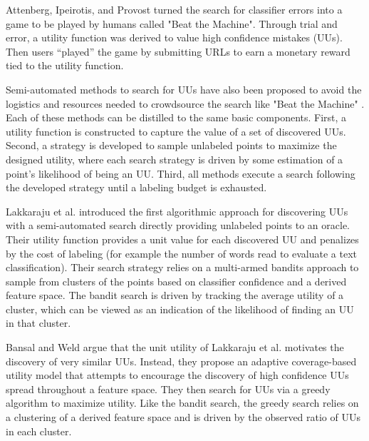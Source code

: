 \documentclass[10pt, conference]{IEEEtran}
\begin{document}
Attenberg, Ipeirotis, and Provost \cite{Attenberg2015} turned the search for classifier errors into a game to be played by humans called "Beat the Machine". 
 Through trial and error, a utility function was derived to value high confidence mistakes (UUs). Then users ``played'' the game by submitting URLs to earn a monetary reward tied to the utility function. 

Semi-automated methods to search for UUs have also been proposed to avoid the logistics and resources needed to crowdsource the search like "Beat the Machine" \cite{Lakkaraju2016} \cite{Bansal2018}.  Each of these methods can be distilled to the same basic components.  First, a utility function is constructed to capture the value of a set of discovered UUs. Second, a strategy is developed to sample unlabeled points to maximize the designed utility, where each search strategy is driven by some estimation of a point's likelihood of being an UU.  Third, all methods execute a search following the developed strategy until a labeling budget is exhausted.

Lakkaraju et al. \cite{Lakkaraju2016} introduced the first algorithmic approach for discovering UUs with a semi-automated search directly providing unlabeled points to an oracle.  Their utility function provides a unit value for each discovered UU and penalizes by the cost of labeling (for example the number of words read to evaluate a text classification). Their search strategy relies on a multi-armed bandits approach to sample from clusters of the points based on classifier confidence and a derived feature space.
The bandit search is driven by tracking the average utility of a cluster, which can be viewed as an indication of the likelihood of finding an UU in that cluster. 

Bansal and Weld \cite{Bansal2018} argue that the unit utility of Lakkaraju et al. \cite{Lakkaraju2016} motivates the discovery of very similar UUs. Instead, they propose an adaptive coverage-based utility model that attempts to encourage the discovery of high confidence UUs spread throughout a feature space. They then search for UUs via a greedy algorithm to maximize utility.  Like the bandit search, the greedy search relies on a clustering of a derived feature space and is driven by the observed ratio of UUs in each cluster. 
\end{document}
